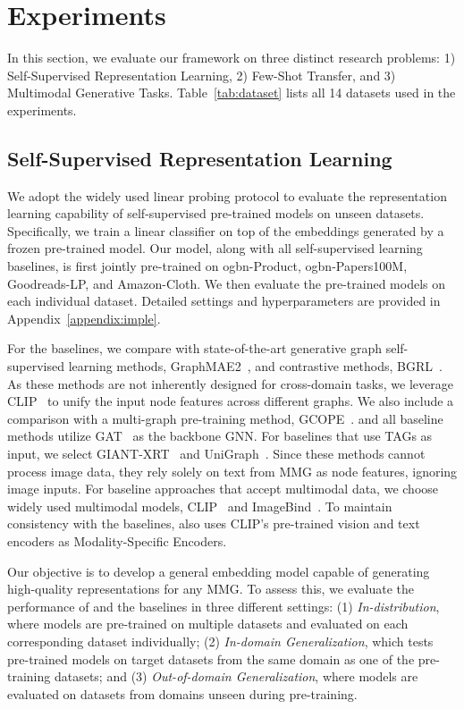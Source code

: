\vspace{-1mm}
\section{Experiments}
In this section, we evaluate our \model framework on three distinct research problems: 1) Self-Supervised Representation Learning, 2) Few-Shot Transfer, and 3) Multimodal Generative Tasks. 
Table~\ref{tab:dataset} lists all 14 datasets used in the experiments.
\vspace{-1mm}
\subsection{Self-Supervised Representation Learning}
\label{sec:lp}
We adopt the widely used linear probing protocol to evaluate the representation learning capability of self-supervised pre-trained models on unseen datasets. Specifically, we train a linear classifier on top of the embeddings generated by a frozen pre-trained model. Our model, along with all self-supervised learning baselines, is first jointly pre-trained on ogbn-Product, ogbn-Papers100M, Goodreads-LP, and Amazon-Cloth. We then evaluate the pre-trained models on each individual dataset. Detailed settings and hyperparameters are provided in Appendix~\ref{appendix:imple}.

For the baselines, we compare \model with state-of-the-art generative graph self-supervised learning methods, GraphMAE2~\cite{hou2023graphmae2}, and contrastive methods, BGRL~\cite{thakoor2021bootstrapped}. As these methods are not inherently designed for cross-domain tasks, we leverage CLIP~\cite{radford2021learning} to unify the input node features across different graphs. We also include a comparison with a multi-graph pre-training method, GCOPE~\cite{zhao2024all}. \model and all baseline methods utilize GAT~\cite{velivckovic2018graph} as the backbone GNN. 
For baselines that use TAGs as input, we select GIANT-XRT~\cite{zhaolearning} and UniGraph~\cite{he2024unigraphlearningunifiedcrossdomain}. Since these methods cannot process image data, they rely solely on text from MMG as node features, ignoring image inputs. For baseline approaches that accept multimodal data, we choose widely used multimodal models, CLIP~\cite{radford2021learning} and ImageBind~\cite{girdhar2023imagebind}. To maintain consistency with the baselines, \model also uses CLIP's pre-trained vision and text encoders as Modality-Specific Encoders.


Our objective is to develop a general embedding model capable of generating high-quality representations for any MMG. To assess this, we evaluate the performance of \model and the baselines in three different settings: (1) \textit{In-distribution}, where models are pre-trained on multiple datasets and evaluated on each corresponding dataset individually; (2) \textit{In-domain Generalization}, which tests pre-trained models on target datasets from the same domain as one of the pre-training datasets; and (3) \textit{Out-of-domain Generalization}, where models are evaluated on datasets from domains unseen during pre-training.

